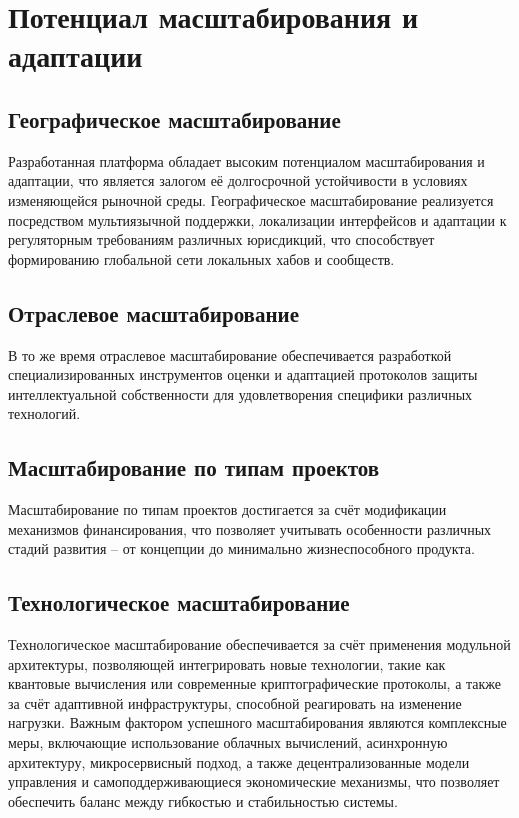 \documentclass[
    candidate, %
    subf, %
    dotsinheaders=false,
]{disser}
\begin{document}
\section{Потенциал масштабирования и адаптации}

\subsection{Географическое масштабирование}
Разработанная платформа обладает высоким потенциалом масштабирования и адаптации, что является залогом её долгосрочной устойчивости в условиях изменяющейся рыночной среды. Географическое масштабирование реализуется посредством мультиязычной поддержки, локализации интерфейсов и адаптации к регуляторным требованиям различных юрисдикций, что способствует формированию глобальной сети локальных хабов и сообществ.

\subsection{Отраслевое масштабирование}
В то же время отраслевое масштабирование обеспечивается разработкой специализированных инструментов оценки и адаптацией протоколов защиты интеллектуальной собственности для удовлетворения специфики различных технологий.

\subsection{Масштабирование по типам проектов}
Масштабирование по типам проектов достигается за счёт модификации механизмов финансирования, что позволяет учитывать особенности различных стадий развития – от концепции до минимально жизнеспособного продукта.

\subsection{Технологическое масштабирование}
Технологическое масштабирование обеспечивается за счёт применения модульной архитектуры, позволяющей интегрировать новые технологии, такие как квантовые вычисления или современные криптографические протоколы, а также за счёт адаптивной инфраструктуры, способной реагировать на изменение нагрузки. Важным фактором успешного масштабирования являются комплексные меры, включающие использование облачных вычислений, асинхронную архитектуру, микросервисный подход, а также децентрализованные модели управления и самоподдерживающиеся экономические механизмы, что позволяет обеспечить баланс между гибкостью и стабильностью системы.
\end{document}
